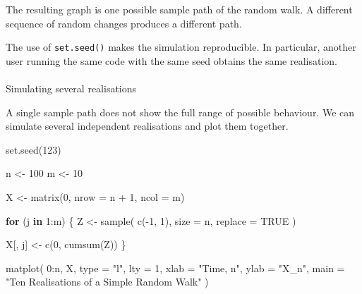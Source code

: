 \documentclass[
  letterpaper,
  DIV=11,
  numbers=noendperiod]{scrartcl}
\makeatletter
\let\oldparagraph\paragraph
\renewcommand{\paragraph}{
    \@ifstar
      \xxxParagraphStar
      \xxxParagraphNoStar
  }
\newcommand{\xxxParagraphStar}[1]{\oldparagraph*{#1}\mbox{}}
\newcommand{\xxxParagraphNoStar}[1]{\oldparagraph{#1}\mbox{}}
\newenvironment{Shaded}{\begin{snugshade}}{\end{snugshade}}
\newcommand{\AttributeTok}[1]{\textcolor[rgb]{0.40,0.45,0.13}{#1}}
\newcommand{\ConstantTok}[1]{\textcolor[rgb]{0.56,0.35,0.01}{#1}}
\newcommand{\ControlFlowTok}[1]{\textcolor[rgb]{0.00,0.23,0.31}{\textbf{#1}}}
\newcommand{\DecValTok}[1]{\textcolor[rgb]{0.68,0.00,0.00}{#1}}
\newcommand{\FunctionTok}[1]{\textcolor[rgb]{0.28,0.35,0.67}{#1}}
\newcommand{\NormalTok}[1]{\textcolor[rgb]{0.00,0.23,0.31}{#1}}
\newcommand{\OtherTok}[1]{\textcolor[rgb]{0.00,0.23,0.31}{#1}}
\newcommand{\SpecialCharTok}[1]{\textcolor[rgb]{0.37,0.37,0.37}{#1}}
\newcommand{\StringTok}[1]{\textcolor[rgb]{0.13,0.47,0.30}{#1}}
\theoremstyle{definition}
\theoremstyle{remark}
\makeatother
\begin{document}
The resulting graph is one possible sample path of the random walk. A
different sequence of random changes produces a different path.

The use of \texttt{set.seed()} makes the simulation reproducible. In
particular, another user running the same code with the same seed
obtains the same realisation.

\paragraph{Simulating several
realisations}\label{simulating-several-realisations}

A single sample path does not show the full range of possible behaviour.
We can simulate several independent realisations and plot them together.

\begin{Shaded}
\begin{Highlighting}[]
\FunctionTok{set.seed}\NormalTok{(}\DecValTok{123}\NormalTok{)}

\NormalTok{n }\OtherTok{\textless{}{-}} \DecValTok{100}
\NormalTok{m }\OtherTok{\textless{}{-}} \DecValTok{10}

\NormalTok{X }\OtherTok{\textless{}{-}} \FunctionTok{matrix}\NormalTok{(}\DecValTok{0}\NormalTok{, }\AttributeTok{nrow =}\NormalTok{ n }\SpecialCharTok{+} \DecValTok{1}\NormalTok{, }\AttributeTok{ncol =}\NormalTok{ m)}

\ControlFlowTok{for}\NormalTok{ (j }\ControlFlowTok{in} \DecValTok{1}\SpecialCharTok{:}\NormalTok{m) \{}
\NormalTok{  Z }\OtherTok{\textless{}{-}} \FunctionTok{sample}\NormalTok{(}
    \FunctionTok{c}\NormalTok{(}\SpecialCharTok{{-}}\DecValTok{1}\NormalTok{, }\DecValTok{1}\NormalTok{),}
    \AttributeTok{size =}\NormalTok{ n,}
    \AttributeTok{replace =} \ConstantTok{TRUE}
\NormalTok{  )}

\NormalTok{  X[, j] }\OtherTok{\textless{}{-}} \FunctionTok{c}\NormalTok{(}\DecValTok{0}\NormalTok{, }\FunctionTok{cumsum}\NormalTok{(Z))}
\NormalTok{\}}

\FunctionTok{matplot}\NormalTok{(}
  \DecValTok{0}\SpecialCharTok{:}\NormalTok{n, X,}
  \AttributeTok{type =} \StringTok{"l"}\NormalTok{,}
  \AttributeTok{lty =} \DecValTok{1}\NormalTok{,}
  \AttributeTok{xlab =} \StringTok{"Time, n"}\NormalTok{,}
  \AttributeTok{ylab =} \StringTok{"X\_n"}\NormalTok{,}
  \AttributeTok{main =} \StringTok{"Ten Realisations of a Simple Random Walk"}
\NormalTok{)}
\end{Highlighting}
\end{Shaded}
\end{document}
